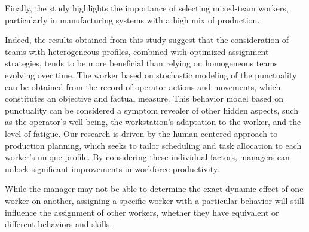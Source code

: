 \documentclass[review,12pt, 3p, times]{elsarticle}
\begin{document}

Finally, the study highlights the importance of selecting mixed-team workers, particularly in manufacturing systems with a high mix of production.  

Indeed, the results obtained from this study suggest that the consideration of teams with heterogeneous profiles, combined with optimized assignment strategies, tends to be more beneficial than relying on homogeneous teams evolving over time. The worker  based on stochastic modeling of the punctuality can be obtained from the record of operator actions and movements, which constitutes an objective and factual measure. This behavior model based on punctuality can be considered a symptom revealer of other hidden aspects, such as the operator's well-being, the workstation's adaptation to the worker, and the level of fatigue. Our research is driven by the human-centered approach to production planning, which seeks to tailor scheduling and task allocation to each worker's unique profile. By considering these individual factors, managers can unlock significant improvements in workforce productivity. 

While the manager may not be able to determine the exact dynamic effect of one worker on another, assigning a specific worker with a particular behavior will still influence the assignment of other workers, whether they have equivalent or different behaviors and skills. 

					
\end{document}

